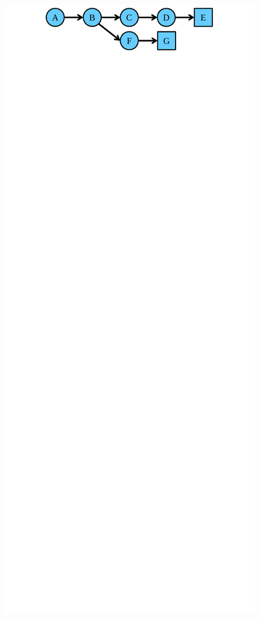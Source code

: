 \begin{figure}
\begin{center}
{    \includegraphics[width=\columnwidth]{figs/all_drop.pdf}
}
\end{center}
\end{figure}
